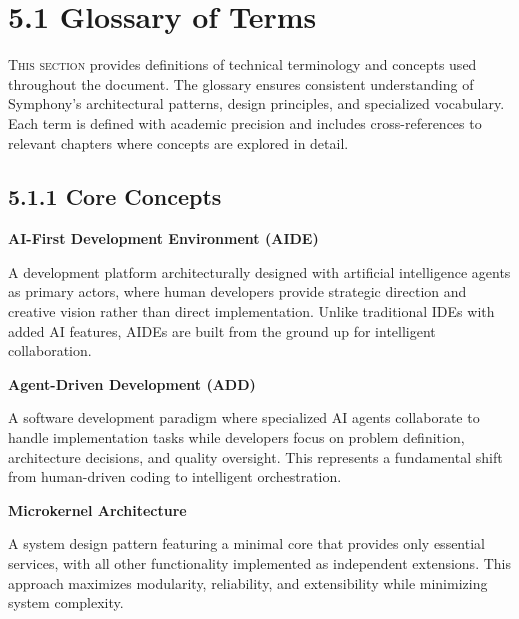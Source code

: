 
\section{5.1 Glossary of Terms}
\label{sec:glossary}
\setcounter{subsection}{0}

\lettrine{T}{his section} provides definitions of technical terminology and concepts used throughout the document. The glossary ensures consistent understanding of Symphony's architectural patterns, design principles, and specialized vocabulary. Each term is defined with academic precision and includes cross-references to relevant chapters where concepts are explored in detail.

\subsection*{5.1.1 Core Concepts}

\vspace{0.3cm}

\noindent\textbf{AI-First Development Environment (AIDE)}

A development platform architecturally designed with artificial intelligence agents as primary actors, where human developers provide strategic direction and creative vision rather than direct implementation. Unlike traditional IDEs with added AI features, AIDEs are built from the ground up for intelligent collaboration.

\vspace{0.3cm}

\noindent\textbf{Agent-Driven Development (ADD)}

A software development paradigm where specialized AI agents collaborate to handle implementation tasks while developers focus on problem definition, architecture decisions, and quality oversight. This represents a fundamental shift from human-driven coding to intelligent orchestration.

\vspace{0.3cm}

\noindent\textbf{Microkernel Architecture}

A system design pattern featuring a minimal core that provides only essential services, with all other functionality implemented as independent extensions. This approach maximizes modularity, reliability, and extensibility while minimizing system complexity.

